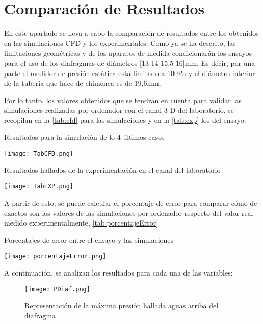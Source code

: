\label{ch:conclusiones}


\section{Comparación de Resultados}\label{sec:comparativa}

En este apartado se lleva a cabo la comparación de resultados entre los
obtenidos en las simulaciones CFD y los experimentales. Como ya se ha
descrito, las limitaciones geométricas y de los aparatos de medida
condicionarán los ensayos para el uso de los diafragmas de diámetros
{[}13-14-15,5-16{]}mm. Es decir, por una parte el medidor de presión
estática está limitado a 100Pa y el diámetro interior de la tubería que
hace de chimenea es de 19,6mm.

Por lo tanto, los valores
obtenidos que se tendrán en cuenta para validar las simulaciones
realizadas por ordenador con el canal 3-D del laboratorio, se recopilan en la \autoref{tab:cfd} para las simulaciones y en la \autoref{tab:exp} los del ensayo.

\begin{table}
\centering
\caption{Resultados para la simulación de lo 4 últimos casos}
\texttt{[image: TabCFD.png]}
\label{tab:cfd}
\end{table}

\begin{table}
\centering
\caption{Resultados hallados de la experimentación en el
canal del laboratorio}
\texttt{[image: TabEXP.png]}
\label{tab:exp}
\end{table}

A partir de esto, se puede calcular el porcentaje de error para comparar
cómo de exactos son los valores de las simulaciones por ordenador
respecto del valor real medido experimentalmente, \autoref{tab:porcentajeError}

\begin{table}
\centering
\caption{Porcentajes de error entre el ensayo y las simulaciones}
\label{tab:porcentajeError}
\texttt{[image: porcentajeError.png]}
\end{table}

A continuación, se analizan los resultados para cada una de las
variables:

\begin{figure}
\centering
\texttt{[image: PDiaf.png]}
\caption[Presión máxima aguas arriba del diafragma]{Representación de la máxima presión hallada aguas arriba del diafragma}
\label{fig:PDiaf}
\end{figure}

